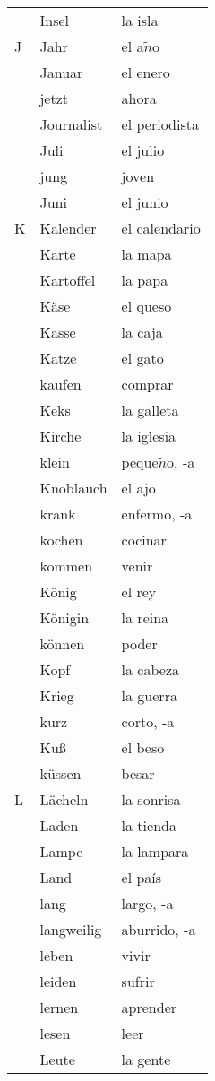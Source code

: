 \documentclass[10pt,spanish]{article}
\begin{document}
\begin{longtable}{p{} p{} | p{}}
& Insel & la isla  \\
J & Jahr & el a$\tilde{n}$o \\
& Januar & el enero  \\
& jetzt & ahora \\
& Journalist & el periodista  \\
& Juli & el julio  \\
& jung & joven \\
& Juni & el junio  \\
K & Kalender & el calendario  \\
& Karte & la mapa  \\
& Kartoffel & la papa  \\
& Käse & el queso  \\
& Kasse & la caja  \\
& Katze & el gato  \\
& kaufen & comprar  \\
& Keks & la galleta  \\
& Kirche & la iglesia  \\
& klein & peque$\tilde{n}$o, -a  \\
& Knoblauch & el ajo  \\
& krank & enfermo, -a \\
& kochen & cocinar  \\
& kommen & venir  \\
& König & el rey  \\
& Königin & la reina  \\
& können & poder  \\
& Kopf & la cabeza \\
& Krieg & la guerra  \\
& kurz & corto, -a  \\
& Kuß & el beso  \\
& küssen & besar  \\
L & Lächeln & la sonrisa  \\
& Laden & la tienda  \\
& Lampe & la lampara  \\
& Land & el país  \\
& lang & largo, -a  \\
& langweilig & aburrido, -a\\
& leben & vivir  \\
& leiden & sufrir  \\
& lernen & aprender  \\
& lesen & leer  \\
& Leute & la gente \\

\end{longtable}
\end{document}
